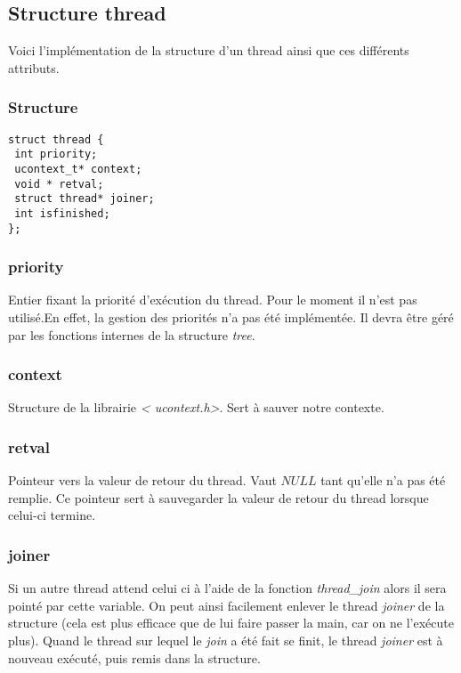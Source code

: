 \subsection{Structure thread}
Voici l'implémentation de la structure d'un thread ainsi que ces
différents attributs.

\subsubsection{Structure}

\begin{verbatim}
struct thread { 
 int priority;
 ucontext_t* context; 
 void * retval;
 struct thread* joiner; 
 int isfinished; 
};
\end{verbatim}

\subsubsection{priority}
Entier fixant la priorité d'exécution du thread. Pour le moment il
n'est pas utilisé.En effet, la gestion des priorités n'a pas été
implémentée.  Il devra être géré par les fonctions internes de la
structure \textit{tree}.

\subsubsection{context}
Structure de la librairie \textit{\textless
  ucontext.h\textgreater}. Sert à sauver notre contexte.
 
\subsubsection{retval}
Pointeur vers la valeur de retour du thread. Vaut $NULL$ tant qu'elle
n'a pas été remplie. Ce pointeur sert à sauvegarder la valeur de
retour du thread lorsque celui-ci termine.

\subsubsection{joiner}
Si un autre thread attend celui ci à l'aide de la fonction
\textit{thread\_join} alors il sera pointé par cette variable. On peut
ainsi facilement enlever le thread \textit{joiner} de la structure
(cela est plus efficace que de lui faire passer la main, car on ne
l'exécute plus). Quand le thread sur lequel le \textit{join} a été
fait se finit, le thread \textit{joiner} est à nouveau exécuté, puis
remis dans la structure.

